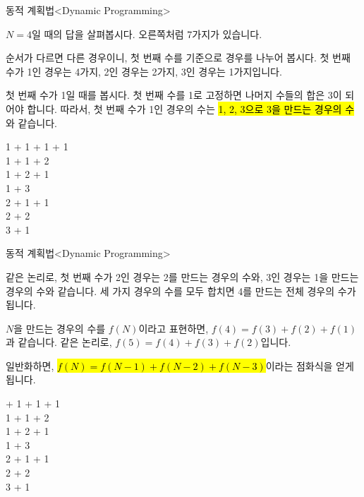 \begin{frame}{동적 계획법}{<Dynamic Programming>}
  \begin{twocol}
    $N = 4$일 때의 답을 살펴봅시다. 오른쪽처럼 7가지가 있습니다.\par\vspace{2mm}
    순서가 다르면 다른 경우이니, \alert{첫 번째 수를 기준으로} 경우를 나누어 봅시다.
    첫 번째 수가 1인 경우는 4가지, 2인 경우는 2가지, 3인 경우는 1가지입니다.\par\vspace{2mm}
    첫 번째 수가 1일 때를 봅시다. 첫 번째 수를 1로 고정하면 나머지 수들의 합은 3이 되어야 합니다.
    따라서, 첫 번째 수가 1인 경우의 수는 \hl{1, 2, 3으로 3을 만드는 경우의 수}와 같습니다.
  \colsplit
    \vspace{4mm}
    \begin{center}\ttfamily
      \alert{1} + 1 + 1 + 1\\[1mm]
      \alert{1} + 1 + 2\\[1mm]
      \alert{1} + 2 + 1\\[1mm]
      \alert{1} + 3\\[1mm]
      2 + 1 + 1\\[1mm]
      2 + 2\\[1mm]
      3 + 1
    \end{center}
  \end{twocol}
\end{frame}

\begin{frame}{동적 계획법}{<Dynamic Programming>}
  \begin{twocol}
    같은 논리로, 첫 번째 수가 2인 경우는 2를 만드는 경우의 수와, 3인 경우는 1을 만드는
    경우의 수와 같습니다. 세 가지 경우의 수를 모두 합치면 4를 만드는 전체 경우의 수가 됩니다.\par\vspace{2mm}
    $N$을 만드는 경우의 수를 $f(N)$이라고 표현하면, $f(4) = f(3) + f(2) + f(1)$과 같습니다.
    같은 논리로, $f(5) = f(4) + f(3) + f(2)$입니다.\par\vspace{2mm}
    일반화하면, \hl{$f(N) = f(N{-}1) + f(N{-}2) + f(N{-}3)$}이라는 점화식을 얻게 됩니다.
  \colsplit
    \vspace{4mm}
    \begin{center} + 1 + 1 + 1\\[1mm]
      1 + 1 + 2\\[1mm]
      1 + 2 + 1\\[1mm]
      1 + 3\\[1mm]
      2 + 1 + 1\\[1mm]
      2 + 2\\[1mm]
      3 + 1
    \end{center}
  \end{twocol}
\end{frame}

